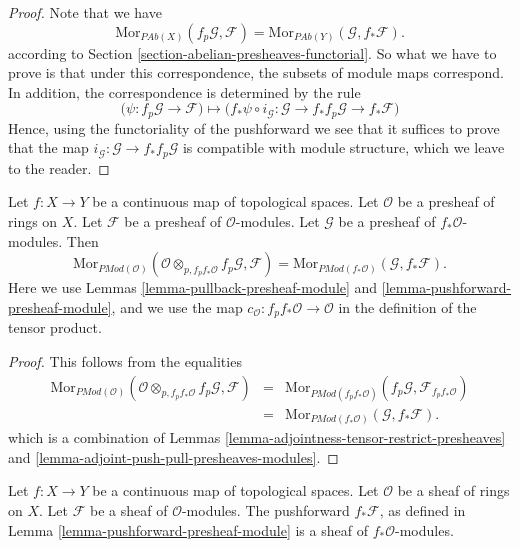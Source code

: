 \begin{proof}
Note that we have
$$
\text{Mor}_{\textit{PAb}(X)}(f_p\mathcal{G}, \mathcal{F})
=
\text{Mor}_{\textit{PAb}(Y)}(\mathcal{G}, f_*\mathcal{F}).
$$
according to Section \ref{section-abelian-presheaves-functorial}.
So what we have to prove is that under this correspondence, the
subsets of module maps correspond. In addition, the correspondence
is determined by the rule
$$
\Big(\psi : f_p\mathcal{G} \to \mathcal{F}\Big)
\longmapsto
\Big(f_*\psi \circ i_\mathcal{G} :
\mathcal{G} \to f_* f_p \mathcal{G} \to f_* \mathcal{F}\Big)
$$
Hence, using the functoriality of the pushforward we see that
it suffices to prove that the map
$i_\mathcal{G} : \mathcal{G} \to f_* f_p \mathcal{G}$
is compatible with module structure, which we leave to the reader.
\end{proof}

\begin{lemma}
\label{lemma-adjoint-pull-push-presheaves-modules}
Let $f : X \to Y$ be a continuous map of topological spaces.
Let $\mathcal{O}$ be a presheaf of rings on $X$.
Let $\mathcal{F}$ be a presheaf of $\mathcal{O}$-modules.
Let $\mathcal{G}$ be a presheaf of $f_*\mathcal{O}$-modules.
Then
$$
\text{Mor}_{\textit{PMod}(\mathcal{O})}(
\mathcal{O} \otimes_{p, f_pf_*\mathcal{O}} f_p\mathcal{G}, \mathcal{F})
=
\text{Mor}_{\textit{PMod}(f_*\mathcal{O})}(\mathcal{G}, f_*\mathcal{F}).
$$
Here we use
Lemmas \ref{lemma-pullback-presheaf-module}
and \ref{lemma-pushforward-presheaf-module}, and we use
the map $c_{\mathcal{O}} : f_pf_*\mathcal{O} \to \mathcal{O}$
in the definition of the tensor product.
\end{lemma}

\begin{proof}
This follows from the equalities
\begin{eqnarray*}
\text{Mor}_{\textit{PMod}(\mathcal{O})}(
\mathcal{O} \otimes_{p, f_pf_*\mathcal{O}} f_p\mathcal{G}, \mathcal{F})
& = &
\text{Mor}_{\textit{PMod}(f_pf_*\mathcal{O})}(
f_p\mathcal{G}, \mathcal{F}_{f_pf_*\mathcal{O}}) \\
& = &
\text{Mor}_{\textit{PMod}(f_*\mathcal{O})}(\mathcal{G}, f_*\mathcal{F}).
\end{eqnarray*}
which is a combination of
Lemmas \ref{lemma-adjointness-tensor-restrict-presheaves}
and \ref{lemma-adjoint-push-pull-presheaves-modules}.
\end{proof}

\begin{lemma}
\label{lemma-pushforward-module}
Let $f : X \to Y$ be a continuous map of topological spaces.
Let $\mathcal{O}$ be a sheaf of rings on $X$. Let
$\mathcal{F}$ be a sheaf of $\mathcal{O}$-modules.
The pushforward $f_*\mathcal{F}$, as defined in
Lemma \ref{lemma-pushforward-presheaf-module}
is a sheaf of $f_*\mathcal{O}$-modules.
\end{lemma}

